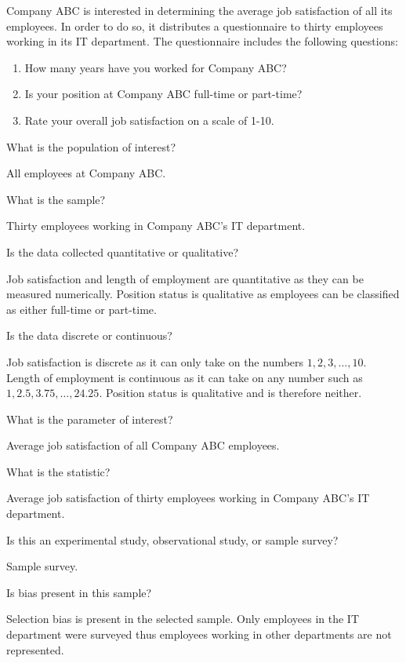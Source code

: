 \begin{example}
Company ABC is interested in determining the average job satisfaction of all its employees. In order to do so, it distributes a questionnaire to thirty employees working in its IT department. The questionnaire includes the following questions:
\begin{enumerate}
\item How many years have you worked for Company ABC?
\item Is your position at Company ABC full-time or part-time?
\item Rate your overall job satisfaction on a scale of 1-10.
\end{enumerate}

\begin{benumerate}
\item What is the population of interest?
\item[] All employees at Company ABC.
\item What is the sample? 
\item[] Thirty employees working in Company ABC's IT department.
\item Is the data collected quantitative or qualitative? 
\item[] Job satisfaction and length of employment are quantitative as they can be measured numerically. Position status is qualitative as employees can be classified as either full-time or part-time.
\item Is the data discrete or continuous? 
\item[] Job satisfaction is discrete as it can only take on the numbers $1, 2, 3, \hdots, 10$. Length of employment is continuous as it can take on any number such as $1, 2.5, 3.75, \hdots, 24.25$. Position status is qualitative and is therefore neither.
\item What is the parameter of interest? 
\item[] Average job satisfaction of all Company ABC employees.
\item What is the statistic?
\item[] Average job satisfaction of thirty employees working in Company ABC's IT department.
\item Is this an experimental study, observational study, or sample survey? 
\item[] Sample survey.
\item Is bias present in this sample? 
\item[] Selection bias is present in the selected sample. Only employees in the IT department were surveyed thus employees working in other departments are not represented.
\end{benumerate}


\end{example}
